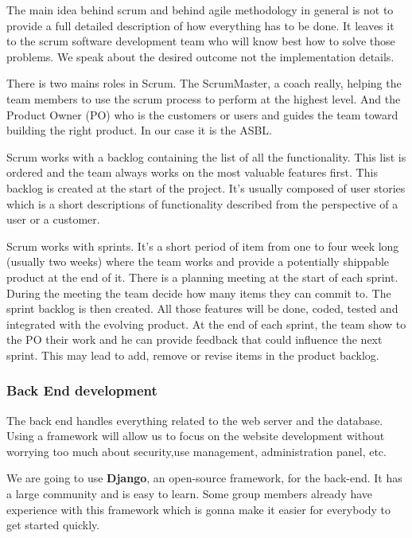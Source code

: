 The main idea behind scrum and behind agile methodology in general is not to provide a full detailed description of how everything has to be done. It leaves it to the scrum software development team who will know best how to solve those problems. We speak about the desired outcome not the implementation details.\newline

There is two mains roles in Scrum. The ScrumMaster, a coach really, helping the team members to use the scrum process to perform at the highest level. And the Product Owner (PO) who is the customers or users and guides the team toward building the right product. In our case it is the ASBL.\newline

Scrum works with a backlog containing the list of all the functionality. This list is ordered and the team always works on the most valuable features first. This backlog is created at the start of the project. It's usually composed of user stories which is a short descriptions of functionality described from the perspective of a user or a customer.\newline

Scrum works with sprints. It's a short period of item from one to four week long (usually two weeks) where the team works and provide a potentially shippable product at the end of it. There is a planning meeting at the start of each sprint. During the meeting the team decide how many items they can commit to. The sprint backlog is then created. All those features will be done, coded, tested and integrated with the evolving product. At the end of each sprint, the team show to the PO their work and he can provide feedback that could influence the next sprint. This may lead to add, remove or revise items in the product backlog.\newline

\iffalse
\subsubsection{Back End development}
The back end handles everything related to the web server and the database. Using a framework will allow us to focus on the website development without worrying too much about security,use management, administration panel, etc.\newline

We are going to use \textbf{Django}, an open-source framework, for the back-end. It has a large community and is easy to learn. Some group members already have experience with this framework which is gonna make it easier for everybody to get started quickly.\newline

